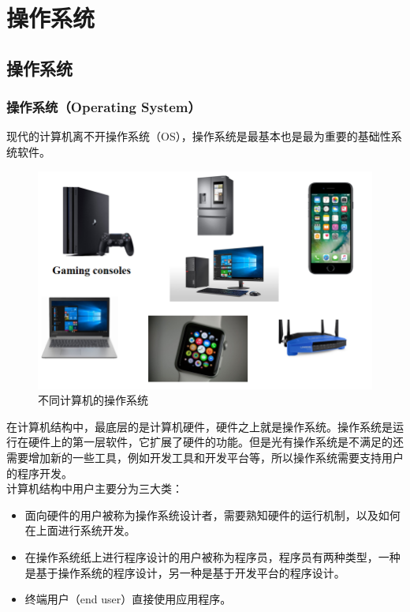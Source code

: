 \chapter{操作系统}

\section{操作系统}

\subsection{操作系统（Operating System）}

现代的计算机离不开操作系统（OS），操作系统是最基本也是最为重要的基础性系统软件。 \\

\begin{figure}[H]
	\centering
	\includegraphics[scale=0.7]{img/C1/1-1/1.png}
	\caption{不同计算机的操作系统}
\end{figure}

在计算机结构中，最底层的是计算机硬件，硬件之上就是操作系统。操作系统是运行在硬件上的第一层软件，它扩展了硬件的功能。但是光有操作系统是不满足的还需要增加新的一些工具，例如开发工具和开发平台等，所以操作系统需要支持用户的程序开发。 \\

计算机结构中用户主要分为三大类：

\begin{itemize}
	\item 面向硬件的用户被称为操作系统设计者，需要熟知硬件的运行机制，以及如何在上面进行系统开发。

	\item 在操作系统纸上进行程序设计的用户被称为程序员，程序员有两种类型，一种是基于操作系统的程序设计，另一种是基于开发平台的程序设计。

	\item 终端用户（end user）直接使用应用程序。
\end{itemize}

